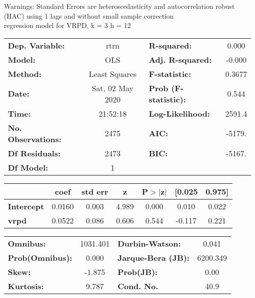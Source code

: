 Warnings: \newline
 [1] Standard Errors are heteroscedasticity and autocorrelation robust (HAC) using 1 lags and without small sample correction\\ 

regression model for VRPD, k = 3 h = 12\begin{center}
\begin{tabular}{lclc}
\toprule
\textbf{Dep. Variable:}    &       rtrn       & \textbf{  R-squared:         } &     0.000   \\
\textbf{Model:}            &       OLS        & \textbf{  Adj. R-squared:    } &    -0.000   \\
\textbf{Method:}           &  Least Squares   & \textbf{  F-statistic:       } &    0.3677   \\
\textbf{Date:}             & Sat, 02 May 2020 & \textbf{  Prob (F-statistic):} &    0.544    \\
\textbf{Time:}             &     21:52:18     & \textbf{  Log-Likelihood:    } &    2591.4   \\
\textbf{No. Observations:} &        2475      & \textbf{  AIC:               } &    -5179.   \\
\textbf{Df Residuals:}     &        2473      & \textbf{  BIC:               } &    -5167.   \\
\textbf{Df Model:}         &           1      & \textbf{                     } &             \\
\bottomrule
\end{tabular}
\begin{tabular}{lcccccc}
                   & \textbf{coef} & \textbf{std err} & \textbf{z} & \textbf{P$> |$z$|$} & \textbf{[0.025} & \textbf{0.975]}  \\
\midrule
\textbf{Intercept} &       0.0160  &        0.003     &     4.989  &         0.000        &        0.010    &        0.022     \\
\textbf{vrpd}      &       0.0522  &        0.086     &     0.606  &         0.544        &       -0.117    &        0.221     \\
\bottomrule
\end{tabular}
\begin{tabular}{lclc}
\textbf{Omnibus:}       & 1031.401 & \textbf{  Durbin-Watson:     } &    0.041  \\
\textbf{Prob(Omnibus):} &   0.000  & \textbf{  Jarque-Bera (JB):  } & 6200.349  \\
\textbf{Skew:}          &  -1.875  & \textbf{  Prob(JB):          } &     0.00  \\
\textbf{Kurtosis:}      &   9.787  & \textbf{  Cond. No.          } &     40.9  \\
\bottomrule
\end{tabular}
\end{center}

